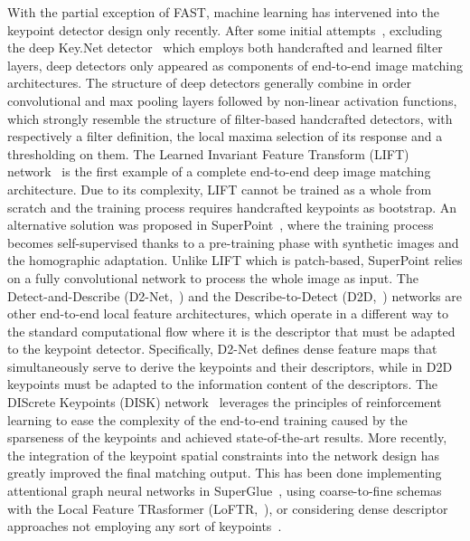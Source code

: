 \documentclass[times,twocolumn,final,authoryear]{elsarticle}
\begin{document}
\vspace{-0.25em}
With the partial exception of FAST, machine learning has intervened into the keypoint detector design only recently.
After some initial attempts~\citep{tilde}, excluding the deep Key.Net detector~\citep{keynet} which employs both handcrafted and learned filter layers, deep detectors only appeared as components of end-to-end image matching architectures. The structure of deep detectors generally combine in order convolutional and max pooling layers followed by non-linear activation functions, which strongly resemble the structure of filter-based handcrafted detectors, with respectively a filter definition, the local maxima selection of its response and a thresholding on them. The Learned Invariant Feature Transform (LIFT) network~\citep{lift} is the first example of a complete end-to-end deep image matching architecture. Due to its complexity, LIFT cannot be trained as a whole from scratch and the training process requires handcrafted keypoints as bootstrap. An alternative solution was proposed in SuperPoint~\citep{superpoint}, where the training process becomes self-supervised thanks to a pre-training phase with synthetic images and the homographic adaptation. Unlike LIFT which is patch-based, SuperPoint relies on a fully convolutional network to process the whole image as input. The Detect-and-Describe (D2-Net,~\cite{d2net}) and the Describe-to-Detect (D2D,~\cite{d2d}) networks are other end-to-end local feature architectures, which operate in a different way to the standard computational flow where it is the descriptor that must be adapted to the keypoint detector. Specifically, D2-Net defines dense feature maps that simultaneously serve to derive the keypoints and their descriptors, while in D2D keypoints must be adapted to the information content of the descriptors. The DIScrete Keypoints (DISK) network~\citep{disk} leverages the principles of reinforcement learning to ease the complexity of the end-to-end training caused by the sparseness of the keypoints and achieved state-of-the-art results. More recently, the integration of the keypoint spatial constraints into the network design has greatly improved the final matching output. This has been done implementing attentional graph neural networks in SuperGlue~\citep{superglue}, using coarse-to-fine schemas with the Local Feature TRasformer (LoFTR,~\cite{loftr}), or considering dense descriptor approaches not employing any sort of keypoints~\citep{dense}.

\vspace{-0.5em}
\end{document}
